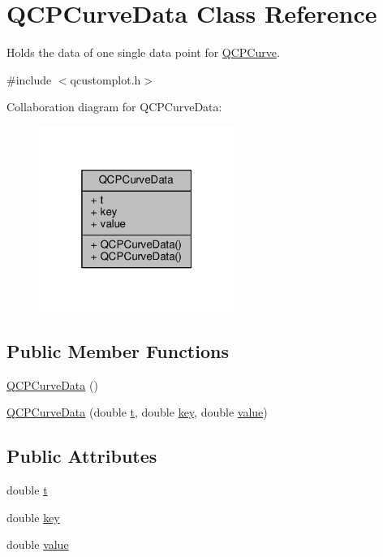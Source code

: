 \hypertarget{class_q_c_p_curve_data}{}\section{Q\+C\+P\+Curve\+Data Class Reference}
\label{class_q_c_p_curve_data}


Holds the data of one single data point for \hyperlink{class_q_c_p_curve}{Q\+C\+P\+Curve}.  




{\ttfamily \#include $<$qcustomplot.\+h$>$}



Collaboration diagram for Q\+C\+P\+Curve\+Data\+:\nopagebreak
\begin{figure}[H]
\begin{center}
\leavevmode
\includegraphics[width=181pt]{class_q_c_p_curve_data__coll__graph}
\end{center}
\end{figure}
\subsection*{Public Member Functions}
\begin{DoxyCompactItemize}
\item 
\hyperlink{class_q_c_p_curve_data_a48252779b5198a509d99c69ae223fbf8}{Q\+C\+P\+Curve\+Data} ()
\item 
\hyperlink{class_q_c_p_curve_data_a3586be0cc6f8db15bcdd0c0d03b0c173}{Q\+C\+P\+Curve\+Data} (double \hyperlink{class_q_c_p_curve_data_aecc395525be28e9178a088793beb3ff3}{t}, double \hyperlink{class_q_c_p_curve_data_a8a4ec5f2b9a396149fd842e309701bd4}{key}, double \hyperlink{class_q_c_p_curve_data_a72b39b8e1dbf7b45382ebd48419b6828}{value})
\end{DoxyCompactItemize}
\subsection*{Public Attributes}
\begin{DoxyCompactItemize}
\item 
double \hyperlink{class_q_c_p_curve_data_aecc395525be28e9178a088793beb3ff3}{t}
\item 
double \hyperlink{class_q_c_p_curve_data_a8a4ec5f2b9a396149fd842e309701bd4}{key}
\item 
double \hyperlink{class_q_c_p_curve_data_a72b39b8e1dbf7b45382ebd48419b6828}{value}
\end{DoxyCompactItemize}


